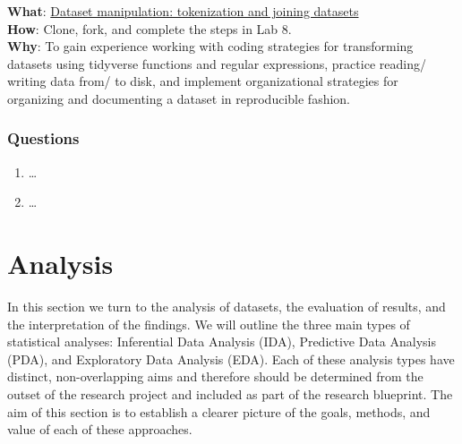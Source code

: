 \documentclass[
  letterpaper,
]{latex/krantz}
\providecommand{\tightlist}{%
  \setlength{\itemsep}{0pt}\setlength{\parskip}{0pt}}\usepackage{longtable,booktabs,array}
\begin{document}
\begin{tcolorbox}[enhanced jigsaw, toprule=.15mm, bottomtitle=1mm, coltitle=black, title=\textcolor{quarto-callout-tip-color}{\faLightbulb}\hspace{0.5em}{Lab}, left=2mm, colframe=quarto-callout-tip-color-frame, bottomrule=.15mm, colbacktitle=quarto-callout-tip-color!10!white, leftrule=.75mm, colback=white, titlerule=0mm, breakable, toptitle=1mm, opacityback=0, arc=.35mm, rightrule=.15mm, opacitybacktitle=0.6]

\textbf{What}: \href{https://github.com/lin380/lab_8}{Dataset
manipulation: tokenization and joining datasets}\\
\textbf{How}: Clone, fork, and complete the steps in Lab 8.\\
\textbf{Why}: To gain experience working with coding strategies for
transforming datasets using tidyverse functions and regular expressions,
practice reading/ writing data from/ to disk, and implement
organizational strategies for organizing and documenting a dataset in
reproducible fashion.

\end{tcolorbox}

\hypertarget{questions-6}{%
\section*{Questions}\label{questions-6}}


\begin{enumerate}
\def\labelenumi{\arabic{enumi}.}
\tightlist
\item
  \ldots{}
\item
  \ldots{}
\end{enumerate}

\part{Analysis}

In this section we turn to the analysis of datasets, the evaluation of
results, and the interpretation of the findings. We will outline the
three main types of statistical analyses: Inferential Data Analysis
(IDA), Predictive Data Analysis (PDA), and Exploratory Data Analysis
(EDA). Each of these analysis types have distinct, non-overlapping aims
and therefore should be determined from the outset of the research
project and included as part of the research blueprint. The aim of this
section is to establish a clearer picture of the goals, methods, and
value of each of these approaches.
\end{document}
